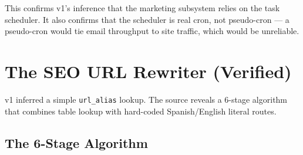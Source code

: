 \documentclass[11pt,a4paper]{article}
\begin{document}
This confirms v1's inference that the marketing subsystem relies on
the task scheduler. It also confirms that the scheduler is real
cron, not pseudo-cron --- a pseudo-cron would tie email throughput
to site traffic, which would be unreliable.

\section{The SEO URL Rewriter (Verified)}\label{sec:seo-source}

v1 inferred a simple \texttt{url\_alias} lookup. The source reveals
a 6-stage algorithm that combines table lookup with hard-coded
Spanish/English literal routes.

\subsection{The 6-Stage Algorithm}
\end{document}
